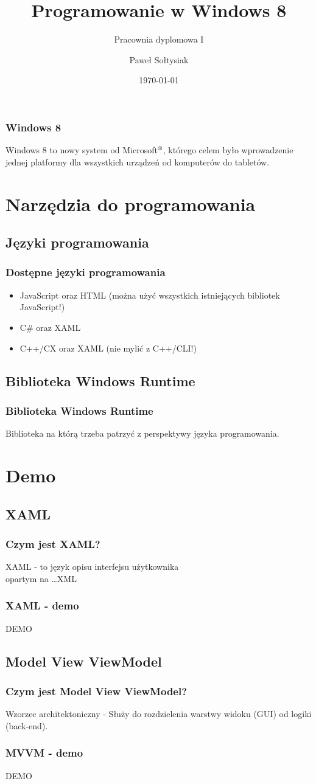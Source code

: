 \documentclass{beamer}
\title{Programowanie w Windows 8}
\subtitle{Pracownia dyplomowa I}
\author{Paweł Sołtysiak}
\institute{Wydział Informatyki\\ Zachodniopomorski Uniwersytet Technologiczny w Szczecinie}
\date{\today}
\begin{document}
\begin{frame}
\titlepage
\end{frame} 

\begin{frame}
\frametitle{Windows 8} 
Windows 8 to nowy system od Microsoft$\textsuperscript{\textregistered}$, którego celem było wprowadzenie jednej platformy dla wszystkich urządzeń od komputerów do tabletów.
\end{frame}

\section{Narzędzia do programowania}
\subsection{Języki programowania}
\begin{frame}
\frametitle{Dostępne języki programowania} 
\begin{itemize}
\item JavaScript oraz HTML (można użyć wszystkich istniejących bibliotek JavaScript!)
\item C\# oraz XAML
\item C++/CX oraz XAML (nie mylić z C++/CLI!)
\end{itemize} 
\end{frame}

\subsection{Biblioteka Windows Runtime}
\begin{frame}
\frametitle{Biblioteka Windows Runtime}
Biblioteka na którą trzeba patrzyć z perspektywy języka programowania.
\end{frame}

\section{Demo}
\subsection{XAML}
\begin{frame}
\frametitle{Czym jest XAML?}
XAML - to język opisu interfejsu użytkownika\\ opartym na \ldots XML
\end{frame}

\begin{frame}
\frametitle{XAML - demo}
\begin{Huge}
DEMO
\end{Huge}
\end{frame}

\subsection{Model View ViewModel}
\begin{frame}
\frametitle{Czym jest Model View ViewModel?}
Wzorzec architektoniczny - Służy do rozdzielenia warstwy widoku (GUI) od logiki (back-end).
\end{frame}

\begin{frame}
\frametitle{MVVM - demo}
\begin{Huge}
DEMO
\end{Huge}
\end{frame}
\end{document}
